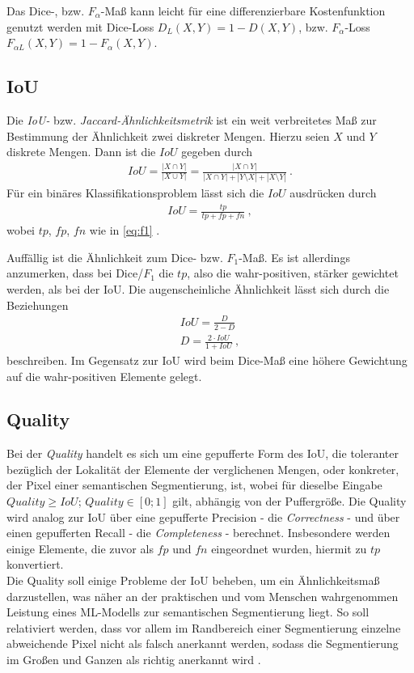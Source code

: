Das Dice-, bzw. $F_{\alpha}$-Maß kann leicht für eine differenzierbare Kostenfunktion genutzt werden mit Dice-Loss $D_{L}(X, Y) = 1 - D(X,Y)$, bzw. $F_{\alpha}$-Loss $F_{\alpha L}(X,Y) = 1 - F_{\alpha}(X,Y)$. 


\subsection{\acf{IoU}}

Die \textit{\acf{IoU}-} bzw. \textit{Jaccard-Ähnlichkeitsmetrik} ist ein weit verbreitetes Maß zur Bestimmung der Ähnlichkeit zwei diskreter Mengen. Hierzu seien $X$ und $Y$ diskrete Mengen. Dann ist die $IoU$ gegeben durch 
\begin{align}
	\label{eq:iou} IoU = \frac{|X\cap Y|}{|X \cup Y|} = \frac{| X \cap Y |}{| X \cap Y | + |Y \setminus X| + |X \setminus Y|}~.
\end{align} 
Für ein binäres Klassifikationsproblem lässt sich die $IoU$ ausdrücken durch 
\begin{align}
	\label{eq:iou-binary} IoU = \frac{tp}{tp + fp + fn}~,
\end{align}
wobei $tp$, $fp$, $fn$ wie in \autoref{eq:f1} \cite{Fletcher.2018}. 

Auffällig ist die Ähnlichkeit zum Dice- bzw. $F_{1}$-Maß. Es ist allerdings anzumerken, dass bei Dice/$F_1$ die $tp$, also die wahr-positiven, stärker gewichtet werden, als bei der \ac{IoU}. Die augenscheinliche Ähnlichkeit lässt sich durch die Beziehungen
\begin{align}
	\label{eq:dice-iou} IoU = \frac{D}{2 - D} \\
	D = \frac{2 \cdot IoU}{1 + IoU} ~,
\end{align}
beschreiben.
Im Gegensatz zur \ac{IoU} wird beim Dice-Maß eine höhere Gewichtung auf die wahr-positiven Elemente 
gelegt.

\subsection{Quality}

Bei der \textit{Quality} handelt es sich um eine gepufferte Form des \ac{IoU},
die toleranter bezüglich der Lokalität der Elemente der verglichenen Mengen, oder konkreter,
der Pixel einer semantischen Segmentierung, ist, 
wobei für dieselbe Eingabe $Quality \geq IoU$; $Quality \in [0;1]$ gilt, abhängig von der Puffergröße. 
Die Quality wird analog zur \ac{IoU} über eine gepufferte Precision - die \textit{Correctness} - 
und über einen gepufferten Recall - die \textit{Completeness} - berechnet. Insbesondere werden einige Elemente, 
die zuvor als $fp$ und $fn$ eingeordnet wurden, hiermit zu $tp$ konvertiert. \\
Die Quality soll einige Probleme der \ac{IoU} beheben, um ein Ähnlichkeitsmaß darzustellen, 
was näher an der praktischen und vom Menschen wahrgenommen Leistung eines \ac{ML}-Modells zur semantischen Segmentierung liegt.
So soll relativiert werden, dass vor allem im Randbereich einer Segmentierung einzelne abweichende Pixel
nicht als falsch anerkannt werden, sodass die Segmentierung im Großen und Ganzen als richtig anerkannt wird \cite{ChristianWiedemann.1998}. 

